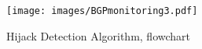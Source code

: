 \chapter{}\label{appendix:flowchart}
\begin{figure}[htbp]
    \centering
    \texttt{[image: images/BGPmonitoring3.pdf]}
    \caption{Hijack Detection Algorithm, flowchart}
    \label{fig:modelflowchart}
\end{figure}
